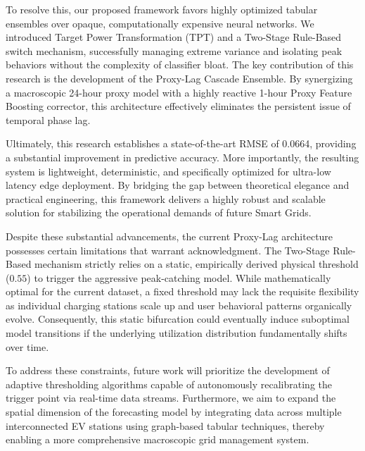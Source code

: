 \documentclass[pdflatex,sn-mathphys-num]{sn-jnl}%
\theoremstyle{thmstyleone}%
\theoremstyle{thmstyletwo}%
\theoremstyle{thmstylethree}%
\begin{document}
To resolve this, our proposed framework favors highly optimized tabular ensembles over opaque, computationally expensive neural networks. We introduced Target Power Transformation (TPT) and a Two-Stage Rule-Based switch mechanism, successfully managing extreme variance and isolating peak behaviors without the complexity of classifier bloat. The key contribution of this research is the development of the Proxy-Lag Cascade Ensemble. By synergizing a macroscopic 24-hour proxy model with a highly reactive 1-hour Proxy Feature Boosting corrector, this architecture effectively eliminates the persistent issue of temporal phase lag. 

Ultimately, this research establishes a state-of-the-art RMSE of 0.0664, providing a substantial improvement in predictive accuracy. More importantly, the resulting system is lightweight, deterministic, and specifically optimized for ultra-low latency edge deployment. By bridging the gap between theoretical elegance and practical engineering, this framework delivers a highly robust and scalable solution for stabilizing the operational demands of future Smart Grids.

Despite these substantial advancements, the current Proxy-Lag architecture possesses certain limitations that warrant acknowledgment. The Two-Stage Rule-Based mechanism strictly relies on a static, empirically derived physical threshold ($0.55$) to trigger the aggressive peak-catching model. While mathematically optimal for the current dataset, a fixed threshold may lack the requisite flexibility as individual charging stations scale up and user behavioral patterns organically evolve. Consequently, this static bifurcation could eventually induce suboptimal model transitions if the underlying utilization distribution fundamentally shifts over time.

To address these constraints, future work will prioritize the development of adaptive thresholding algorithms capable of autonomously recalibrating the trigger point via real-time data streams. Furthermore, we aim to expand the spatial dimension of the forecasting model by integrating data across multiple interconnected EV stations using graph-based tabular techniques, thereby enabling a more comprehensive macroscopic grid management system.

\backmatter



\end{document}
